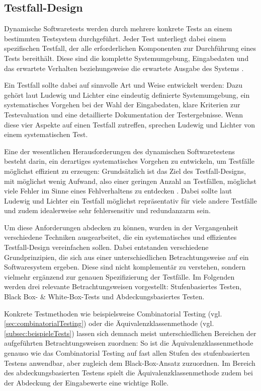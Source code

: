 \subsection{Testfall-Design}\label{subsec:testfallDesign}

Dynamische Softwaretests werden durch mehrere konkrete Tests an einem bestimmten Testsystem durchgeführt. Jeder Test unterliegt dabei einem spezifischen Testfall, der alle erforderlichen Komponenten zur Durchführung eines Tests bereithält. Diese sind die komplette Systemumgebung, Eingabedaten und das erwartete Verhalten beziehungsweise die erwartete Ausgabe des Systems \cite[S. 86]{schneider2012abenteuer}. 

Ein Testfall sollte dabei auf sinnvolle Art und Weise entwickelt werden: Dazu gehört laut Ludewig und Lichter \cite[S. 480]{ludewig2010software} eine eindeutig definierte Systemumgebung, ein systematisches Vorgehen bei der Wahl der Eingabedaten, klare Kriterien zur Testevaluation und eine detaillierte Dokumentation der Testergebnisse. Wenn diese vier Aspekte auf einen Testfall zutreffen, sprechen Ludewig und Lichter von einem \glqq systematischen Test\grqq{}.

Eine der wesentlichen Herausforderungen des dynamischen Softwaretestens besteht darin, ein derartiges systematisches Vorgehen zu entwickeln, um Testfälle möglichst effizient zu erzeugen: Grundsätzlich ist das Ziel des Testfall-Designs, mit möglichst wenig Aufwand, also einer geringen Anzahl an Testfällen, möglichst viele Fehler im Sinne eines Fehlverhaltens zu entdecken \cite[S. 498]{ludewig2010software}. Dabei sollte laut Ludewig und Lichter \cite[S. 498]{ludewig2010software} ein Testfall möglichst repräsentativ für viele andere Testfälle und zudem idealerweise sehr fehlersensitiv und redundanzarm sein.

Um diese Anforderungen abdecken zu können, wurden in der Vergangenheit verschiedene Techniken ausgearbeitet, die ein systematisches und effizientes Testfall-Design vereinfachen sollen. Dabei entstanden verschiedene Grundprinzipien, die sich aus einer unterschiedlichen Betrachtungsweise auf ein Softwaresystem ergeben. Diese sind nicht komplementär zu verstehen, sondern vielmehr ergänzend zur genauen Spezifizierung der Testfälle. Im Folgenden werden drei relevante Betrachtungsweisen vorgestellt: Stufenbasiertes Testen, Black Box- \& White-Box-Tests und Abdeckungsbasiertes Testen.

Konkrete Testmethoden wie beispielsweise Combinatorial Testing (vgl. \autoref{sec:combinatorialTesting}) oder die Äquivalenzklassenmethode (vgl. \autoref{subsec:beispieleTests}) lassen sich demnach meist unterschiedlichen Bereichen der aufgeführten Betrachtungsweisen zuordnen: So ist die Äquivalenzklassenmethode genauso wie das Combinatorial Testing auf fast allen Stufen des stufenbasierten Testens anwendbar, aber zugleich dem Black-Box-Ansatz zuzuordnen. Im Bereich des abdeckungsbasierten Testens spielt die Äquivalenzklassenmethode zudem bei der Abdeckung der Eingabewerte eine wichtige Rolle.

